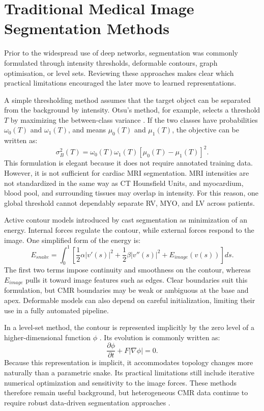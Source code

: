 \section{Traditional Medical Image Segmentation Methods}
Prior to the widespread use of deep networks, segmentation was commonly formulated through intensity thresholds, deformable contours, graph optimisation, or level sets. Reviewing these approaches makes clear which practical limitations encouraged the later move to learned representations.

A simple thresholding method assumes that the target object can be separated from the background by intensity. Otsu's method, for example, selects a threshold $T$ by maximizing the between-class variance \citep{otsu1979threshold}. If the two classes have probabilities $\omega_0(T)$ and $\omega_1(T)$, and means $\mu_0(T)$ and $\mu_1(T)$, the objective can be written as:
\begin{equation}
    \sigma_B^2(T) = \omega_0(T)\omega_1(T)\left[\mu_0(T)-\mu_1(T)\right]^2.
\end{equation}
This formulation is elegant because it does not require annotated training data. However, it is not sufficient for cardiac MRI segmentation. MRI intensities are not standardized in the same way as CT Hounsfield Units, and myocardium, blood pool, and surrounding tissues may overlap in intensity. For this reason, one global threshold cannot dependably separate RV, MYO, and LV across patients.

Active contour models introduced by \citet{kass1988snakes} cast segmentation as minimization of an energy. Internal forces regulate the contour, while external forces respond to the image. One simplified form of the energy is:
\begin{equation}
    E_{snake} = \int_0^1 \left[\frac{1}{2}\alpha |v'(s)|^2 + \frac{1}{2}\beta |v''(s)|^2 + E_{image}(v(s))\right]ds.
\end{equation}
The first two terms impose continuity and smoothness on the contour, whereas $E_{image}$ pulls it toward image features such as edges. Clear boundaries suit this formulation, but CMR boundaries may be weak or ambiguous at the base and apex. Deformable models can also depend on careful initialization, limiting their use in a fully automated pipeline.

In a level-set method, the contour is represented implicitly by the zero level of a higher-dimensional function $\phi$ \citep{osher1988fronts}. Its evolution is commonly written as:
\begin{equation}
    \frac{\partial \phi}{\partial t} + F|\nabla \phi| = 0.
\end{equation}
Because this representation is implicit, it accommodates topology changes more naturally than a parametric snake. Its practical limitations still include iterative numerical optimization and sensitivity to the image forces. These methods therefore remain useful background, but heterogeneous CMR data continue to require robust data-driven segmentation approaches \citep{chen2020cardiacreview}.

